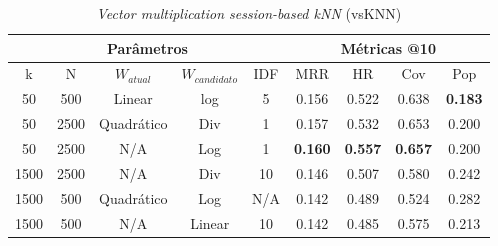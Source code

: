 
\begin{table}[htbp]
\centering
  \begin{tabular}{|c|c|c|c|c|c|c|c|c|}
    \hline
    \multicolumn{5}{|c|}{Parâmetros} & \multicolumn{4}{c|}{Métricas @10} \\
    \hline
    k & N & $W_{atual}$ & $W_{candidato}$ & IDF & MRR & HR & Cov & Pop \\
    \hline
    50 & 500 & Linear & log & 5 & 0.156 & 0.522  & 0.638 & \textbf{0.183} \\
    \hline
    50 & 2500 & Quadrático & Div & 1 & 0.157 & 0.532 & 0.653 & 0.200 \\
    \hline
    50 & 2500 & N/A & Log & 1 & \textbf{0.160} & \textbf{0.557} & \textbf{0.657} & 0.200 \\
    \hline
    1500 & 2500 & N/A & Div & 10 & 0.146 & 0.507 & 0.580 & 0.242 \\
    \hline
    1500 & 500 & Quadrático & Log & N/A & 0.142 & 0.489 & 0.524 & 0.282 \\
    \hline
    1500 & 500 & N/A & Linear & 10 & 0.142 & 0.485 & 0.575 & 0.213 \\
    \hline
  \end{tabular}
  \caption{\textit{Vector multiplication session-based kNN} (vsKNN)}
\end{table}

